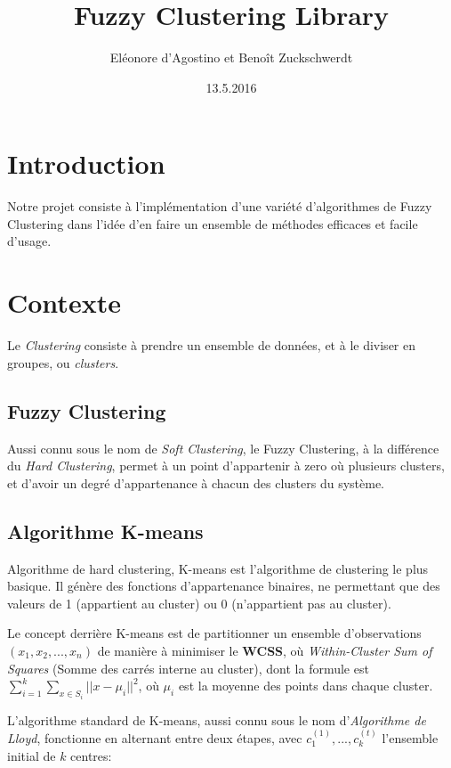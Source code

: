 \documentclass{article}
\title{Fuzzy Clustering Library}
\date{13.5.2016}
\author{Eléonore d'Agostino et Benoît Zuckschwerdt}
\begin{document}
  \maketitle
  \tableofcontents
  \newpage

  \section{Introduction}

    Notre projet consiste à l'implémentation d'une variété d'algorithmes de Fuzzy Clustering dans l'idée d'en faire un ensemble de méthodes efficaces et facile d'usage.

  \section{Contexte}

    Le \textit{Clustering} consiste à prendre un ensemble de données, et à le diviser en groupes, ou \textit{clusters}.

    \subsection{Fuzzy Clustering}

      Aussi connu sous le nom de \textit{Soft Clustering}, le Fuzzy Clustering, à la différence du \textit{Hard Clustering}, permet à un point d'appartenir à zero où plusieurs clusters, et d'avoir un degré d'appartenance à chacun des clusters du système.

    \subsection{Algorithme K-means}

      Algorithme de hard clustering, K-means est l'algorithme de clustering le plus basique. Il génère des fonctions d'appartenance binaires, ne permettant que des valeurs de 1 (appartient au cluster) ou 0 (n'appartient pas au cluster).

      Le concept derrière K-means est de partitionner un ensemble d'observations $(x_1,x_2,...,x_n)$ de manière à minimiser le \textbf{WCSS}, où \textit{Within-Cluster Sum of Squares} (Somme des carrés interne au cluster), dont la formule est $\sum_{i=1}^{k}\sum_{x\in S_i}||x-\mu_i||^2$, où $\mu_i$ est la moyenne des points dans chaque cluster.

      L'algorithme standard de K-means, aussi connu sous le nom d'\textit{Algorithme de Lloyd}, fonctionne en alternant entre deux étapes, avec $c_1^{(1)},...,c_k^{(t)}$ l'ensemble initial de $k$ centres:
\end{document}
